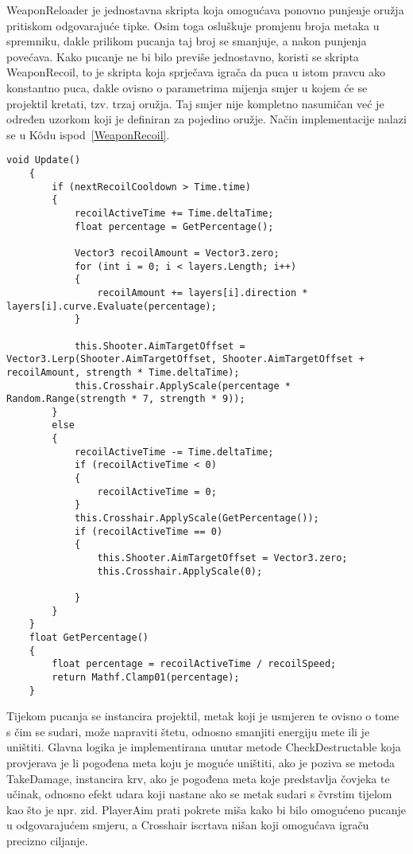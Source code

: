 WeaponReloader je jednostavna skripta koja omogućava ponovno punjenje oružja pritiskom odgovarajuće tipke. Osim toga osluškuje promjenu broja metaka u spremniku, dakle prilikom pucanja taj broj se smanjuje, a nakon punjenja povećava.
Kako pucanje ne bi bilo previše jednostavno, koristi se skripta WeaponRecoil, to je skripta koja sprječava igrača da puca u istom pravcu ako konstantno puca, dakle ovisno o parametrima mijenja smjer u kojem će se projektil kretati, tzv. trzaj oružja. Taj smjer nije kompletno nasumičan već je određen uzorkom koji je definiran za pojedino oružje. Način implementacije nalazi se u K\^odu ispod~\ref{WeaponRecoil}.
\begin{lstlisting}[caption={Trzaj oružja tijekom pucanja}, label=WeaponRecoil]
    void Update()
    {
        if (nextRecoilCooldown > Time.time)
        {
            recoilActiveTime += Time.deltaTime;
            float percentage = GetPercentage();
          
            Vector3 recoilAmount = Vector3.zero;
            for (int i = 0; i < layers.Length; i++)
            {
                recoilAmount += layers[i].direction * layers[i].curve.Evaluate(percentage);
            }

            this.Shooter.AimTargetOffset = Vector3.Lerp(Shooter.AimTargetOffset, Shooter.AimTargetOffset + recoilAmount, strength * Time.deltaTime);
            this.Crosshair.ApplyScale(percentage * Random.Range(strength * 7, strength * 9));
        }
        else
        {
            recoilActiveTime -= Time.deltaTime;
            if (recoilActiveTime < 0)
            {
                recoilActiveTime = 0;
            }
            this.Crosshair.ApplyScale(GetPercentage());
            if (recoilActiveTime == 0)
            {
                this.Shooter.AimTargetOffset = Vector3.zero;
                this.Crosshair.ApplyScale(0);

            }
        }
    }
    float GetPercentage()
    {
        float percentage = recoilActiveTime / recoilSpeed;
        return Mathf.Clamp01(percentage);
    }
\end{lstlisting}

Tijekom pucanja se instancira projektil, metak koji je usmjeren te ovisno o tome s čim se sudari, može napraviti štetu, odnosno smanjiti energiju mete ili je uništiti. Glavna logika je implementirana unutar metode CheckDestructable koja provjerava je li pogođena meta koju je moguće uništiti, ako je poziva se metoda TakeDamage, instancira krv, ako je pogođena meta koje predstavlja čovjeka te učinak, odnosno efekt udara koji nastane ako se metak sudari s čvrstim tijelom kao što je npr. zid.
PlayerAim prati pokrete miša kako bi bilo omogućeno pucanje u odgovarajućem smjeru, a Crosshair iscrtava nišan koji omogućava igraču precizno ciljanje.

